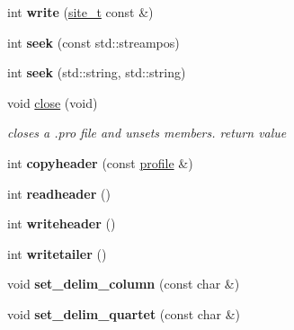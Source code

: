 \begin{DoxyCompactItemize}
\item 
\hypertarget{classprofile_ad5f18fa51ecfa31b5d42d4aeb9e73b4b}{int {\bfseries write} (\hyperlink{classsite__t}{site\-\_\-t} const \&)}\label{classprofile_ad5f18fa51ecfa31b5d42d4aeb9e73b4b}

\item 
\hypertarget{classprofile_ab58c25bc9a2b9f19c949f1eb3929443a}{int {\bfseries seek} (const std\-::streampos)}\label{classprofile_ab58c25bc9a2b9f19c949f1eb3929443a}

\item 
\hypertarget{classprofile_aac930ebe1c76a67ffbab55905136bce2}{int {\bfseries seek} (std\-::string, std\-::string)}\label{classprofile_aac930ebe1c76a67ffbab55905136bce2}

\item 
\hypertarget{classprofile_a6148476d9b8b5a5a20491450d92d0dcb}{void \hyperlink{classprofile_a6148476d9b8b5a5a20491450d92d0dcb}{close} (void)}\label{classprofile_a6148476d9b8b5a5a20491450d92d0dcb}

\begin{DoxyCompactList}\small\item\em closes a .pro file and unsets members.  return value \end{DoxyCompactList}\item 
\hypertarget{classprofile_ada1dcfd3a02b7e2e06d11fa333f23a63}{int {\bfseries copyheader} (const \hyperlink{classprofile}{profile} \&)}\label{classprofile_ada1dcfd3a02b7e2e06d11fa333f23a63}

\item 
\hypertarget{classprofile_a5b4058a8f0132b09130fbf586fddc39d}{int {\bfseries readheader} ()}\label{classprofile_a5b4058a8f0132b09130fbf586fddc39d}

\item 
\hypertarget{classprofile_a2a779c8acb71361916712139ed427c9b}{int {\bfseries writeheader} ()}\label{classprofile_a2a779c8acb71361916712139ed427c9b}

\item 
\hypertarget{classprofile_a3089bc418634f442ef71b930abc68edd}{int {\bfseries writetailer} ()}\label{classprofile_a3089bc418634f442ef71b930abc68edd}

\item 
\hypertarget{classprofile_abe49022e667f3e893dec454511e9aa3d}{void {\bfseries set\-\_\-delim\-\_\-column} (const char \&)}\label{classprofile_abe49022e667f3e893dec454511e9aa3d}

\item 
\hypertarget{classprofile_a627ca3883b151c65a50d0e5e02b40998}{void {\bfseries set\-\_\-delim\-\_\-quartet} (const char \&)}\label{classprofile_a627ca3883b151c65a50d0e5e02b40998}


\end{DoxyCompactItemize}
